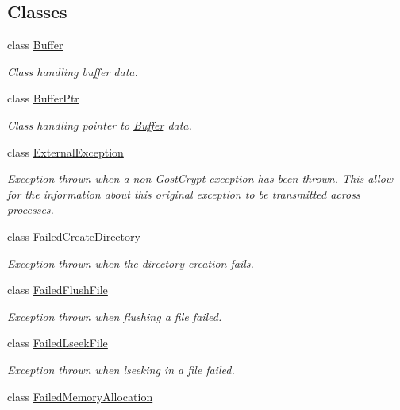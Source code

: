 \subsection*{Classes}
\begin{DoxyCompactItemize}
\item 
class \hyperlink{class_gost_crypt_1_1_buffer}{Buffer}
\begin{DoxyCompactList}\small\item\em Class handling buffer data. \end{DoxyCompactList}\item 
class \hyperlink{class_gost_crypt_1_1_buffer_ptr}{Buffer\+Ptr}
\begin{DoxyCompactList}\small\item\em Class handling pointer to \hyperlink{class_gost_crypt_1_1_buffer}{Buffer} data. \end{DoxyCompactList}\item 
class \hyperlink{class_gost_crypt_1_1_external_exception}{External\+Exception}
\begin{DoxyCompactList}\small\item\em Exception thrown when a non-\/\+Gost\+Crypt exception has been thrown. This allow for the information about this original exception to be transmitted across processes. \end{DoxyCompactList}\item 
class \hyperlink{class_gost_crypt_1_1_failed_create_directory}{Failed\+Create\+Directory}
\begin{DoxyCompactList}\small\item\em Exception thrown when the directory creation fails. \end{DoxyCompactList}\item 
class \hyperlink{class_gost_crypt_1_1_failed_flush_file}{Failed\+Flush\+File}
\begin{DoxyCompactList}\small\item\em Exception thrown when flushing a file failed. \end{DoxyCompactList}\item 
class \hyperlink{class_gost_crypt_1_1_failed_lseek_file}{Failed\+Lseek\+File}
\begin{DoxyCompactList}\small\item\em Exception thrown when lseeking in a file failed. \end{DoxyCompactList}\item 
class \hyperlink{class_gost_crypt_1_1_failed_memory_allocation}{Failed\+Memory\+Allocation}

\end{DoxyCompactItemize}
